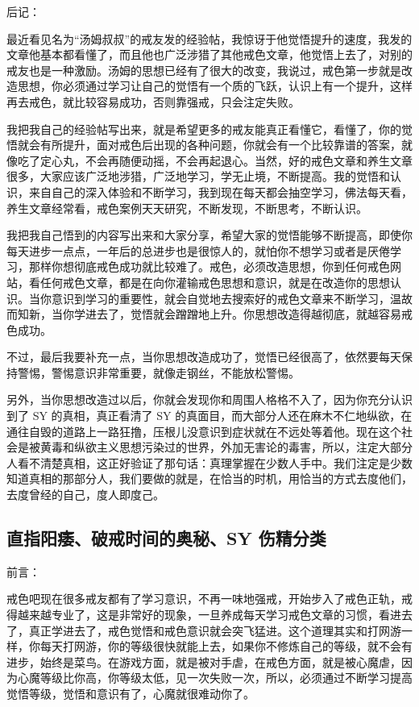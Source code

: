 \documentclass{ctexart}
\begin{document}
后记：

最近看见名为“汤姆叔叔”的戒友发的经验帖，我惊讶于他觉悟提升的速度，我发的文章他基本都看懂了，而且他也广泛涉猎了其他戒色文章，他觉悟上去了，对别的戒友也是一种激励。汤姆的思想已经有了很大的改变，我说过，戒色第一步就是改造思想，你必须通过学习让自己的觉悟有一个质的飞跃，认识上有一个提升，这样再去戒色，就比较容易成功，否则靠强戒，只会注定失败。

我把我自己的经验帖写出来，就是希望更多的戒友能真正看懂它，看懂了，你的觉悟就会有所提升，面对戒色后出现的各种问题，你就会有一个比较靠谱的答案，就像吃了定心丸，不会再随便动摇，不会再起退心。当然，好的戒色文章和养生文章很多，大家应该广泛地涉猎，广泛地学习，学无止境，不断提高。我的觉悟和认识，来自自己的深入体验和不断学习，我到现在每天都会抽空学习，佛法每天看，养生文章经常看，戒色案例天天研究，不断发现，不断思考，不断认识。

我把我自己悟到的内容写出来和大家分享，希望大家的觉悟能够不断提高，即使你每天进步一点点，一年后的总进步也是很惊人的，就怕你不想学习或者是厌倦学习，那样你想彻底戒色成功就比较难了。戒色，必须改造思想，你到任何戒色网站，看任何戒色文章，都是在向你灌输戒色思想和意识，就是在改造你的思想认识。当你意识到学习的重要性，就会自觉地去搜索好的戒色文章来不断学习，温故而知新，当你学进去了，觉悟就会蹭蹭地上升。你思想改造得越彻底，就越容易戒色成功。

不过，最后我要补充一点，当你思想改造成功了，觉悟已经很高了，依然要每天保持警惕，警惕意识非常重要，就像走钢丝，不能放松警惕。

另外，当你思想改造过以后，你就会发现你和周围人格格不入了，因为你充分认识到了 SY 的真相，真正看清了 SY 的真面目，而大部分人还在麻木不仁地纵欲，在通往自毁的道路上一路狂撸，压根儿没意识到症状就在不远处等着他。现在这个社会是被黄毒和纵欲主义思想污染过的世界，外加无害论的毒害，所以，注定大部分人看不清楚真相，这正好验证了那句话：真理掌握在少数人手中。我们注定是少数知道真相的那部分人，我们要做的就是，在恰当的时机，用恰当的方式去度他们，去度曾经的自己，度人即度己。

\subsection{直指阳痿、破戒时间的奥秘、SY 伤精分类}

前言：

戒色吧现在很多戒友都有了学习意识，不再一味地强戒，开始步入了戒色正轨，戒得越来越专业了，这是非常好的现象，一旦养成每天学习戒色文章的习惯，看进去了，真正学进去了，戒色觉悟和戒色意识就会突飞猛进。这个道理其实和打网游一样，你每天打网游，你的等级很快就能上去，如果你不修炼自己的等级，就不会有进步，始终是菜鸟。在游戏方面，就是被对手虐，在戒色方面，就是被心魔虐，因为心魔等级比你高，你等级太低，见一次失败一次，所以，必须通过不断学习提高觉悟等级，觉悟和意识有了，心魔就很难动你了。
\end{document}
